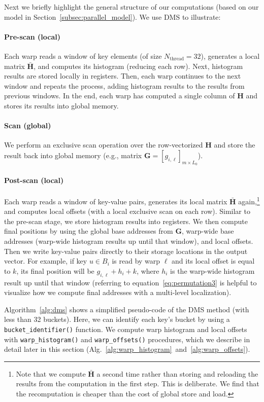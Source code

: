 Next we briefly highlight the general structure of our computations (based on our model in Section~\ref{subsec:parallel_model}). We use DMS to illustrate:

\paragraph{Pre-scan (local)} Each warp reads a window of key elements (of size $N_\text{thread} = 32$), generates a local matrix $\bar{\mathbf{H}}$, and computes its histogram (reducing each row). Next, histogram results are stored locally in registers. Then, each warp continues to the next window and repeats the process, adding histogram results to the results from previous windows.
In the end, each warp has computed a single column of $\mathbf{H}$ and stores its results into global memory.
\paragraph{Scan (global)} We perform an exclusive scan operation over the row-vectorized $\mathbf{H}$ and store the result back into global memory (e.g., matrix $\mathbf{G} = [g_{i,\ell}]_{m\times L_0}$).
\paragraph{Post-scan (local)} Each warp reads a window of key-value pairs, generates its local matrix $\bar{\mathbf{H}}$ again,\footnote{Note that we compute $\bar{\mathbf{H}}$ a second time rather than storing and reloading the results from the computation in the first step. This is deliberate. We find that the recomputation is cheaper than the cost of global store and load.} and computes local offsets (with a local exclusive scan on each row).
Similar to the pre-scan stage, we store histogram results into registers.
We then compute final positions by using the global base addresses from $\mathbf{G}$, warp-wide base addresses (warp-wide histogram results up until that window), and local offsets. Then we write key-value pairs directly to their storage locations in the output vector. For example, if key $u \in B_i$ is read by warp $\ell$ and its local offset is equal to $k$, its final position will be $g_{i,\ell} + h_i + k$, where $h_i$ is the warp-wide histogram result up until that window (referring to equation~\eqref{eq:permutation3} is helpful to visualize how we compute final addresses with a multi-level localization).

Algorithm~\ref{alg:dms} shows a simplified pseudo-code of the DMS method (with less than 32 buckets). Here, we can identify each key's bucket by using a \texttt{bucket\_identifier()} function. We compute warp histogram and local offsets with \texttt{warp\_histogram()} and \texttt{warp\_offsets()} procedures, which we describe in detail later in this section (Alg.~\ref{alg:warp_histogram}~and~\ref{alg:warp_offsets}).

